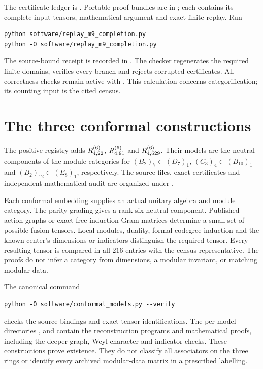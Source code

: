 \documentclass[11pt]{article}
\begin{document}
The certificate ledger is .
Portable proof bundles are in
; each contains its complete
input tensors, mathematical argument and exact finite replay. Run
\begin{verbatim}
python software/replay_m9_completion.py
python -O software/replay_m9_completion.py
\end{verbatim}
The source-bound receipt is recorded in
. The checker regenerates the
required finite domains, verifies every branch and rejects corrupted
certificates. All correctness checks remain active with .
This calculation concerns categorification; its counting input is the cited census.

\section{The three conformal constructions}
The positive registry 
adds $R^{(6)}_{4,22}$, $R^{(6)}_{4,91}$ and $R^{(6)}_{4,629}$.
Their models are the neutral components of the module categories for
$(B_2)_7\subset(D_7)_1$, $(C_3)_4\subset(B_{10})_1$ and
$(B_2)_{12}\subset(E_8)_1$, respectively.
The source files, exact certificates and independent mathematical audit
are organized under .

Each conformal embedding supplies an actual unitary algebra and module
category. The parity grading gives a rank-six neutral component.
Published action graphs or exact free-induction Gram matrices determine
a small set of possible fusion tensors. Local modules, duality,
formal-codegree induction and the known center's dimensions or
indicators distinguish the required tensor. Every resulting tensor is
compared in all $216$ entries with the census representative.
The proofs do not infer a category from dimensions, a modular invariant,
or matching modular data.

The canonical command
\begin{verbatim}
python -O software/conformal_models.py --verify
\end{verbatim}
checks the source bindings and exact tensor identifications. The
per-model directories ,  and
 contain the reconstruction programs and mathematical
proofs, including the deeper graph, Weyl-character and indicator checks.
These constructions prove existence. They do not classify all
associators on the three rings or identify every archived modular-data
matrix in a prescribed labelling.
\end{document}
